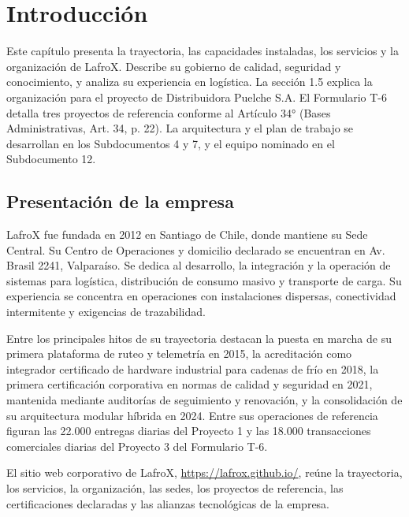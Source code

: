 
\setcounter{chapter}{0}
\chapter{Introducción}
\label{cap:empresa}

Este capítulo presenta la trayectoria, las capacidades instaladas, los servicios y la organización de LafroX. Describe su gobierno de calidad, seguridad y conocimiento, y analiza su experiencia en logística. La sección 1.5 explica la organización para el proyecto de Distribuidora Puelche S.A. El Formulario T-6 detalla tres proyectos de referencia conforme al Artículo 34° (Bases Administrativas, Art. 34, p. 22). La arquitectura y el plan de trabajo se desarrollan en los Subdocumentos 4 y 7, y el equipo nominado en el Subdocumento 12.

\section{Presentación de la empresa}

LafroX fue fundada en 2012 en Santiago de Chile, donde mantiene su Sede Central. Su Centro de Operaciones y domicilio declarado se encuentran en Av. Brasil 2241, Valparaíso. Se dedica al desarrollo, la integración y la operación de sistemas para logística, distribución de consumo masivo y transporte de carga. Su experiencia se concentra en operaciones con instalaciones dispersas, conectividad intermitente y exigencias de trazabilidad.

Entre los principales hitos de su trayectoria destacan la puesta en marcha de su primera plataforma de ruteo y telemetría en 2015, la acreditación como integrador certificado de hardware industrial para cadenas de frío en 2018, la primera certificación corporativa en normas de calidad y seguridad en 2021, mantenida mediante auditorías de seguimiento y renovación, y la consolidación de su arquitectura modular híbrida en 2024. Entre sus operaciones de referencia figuran las 22.000 entregas diarias del Proyecto 1 y las 18.000 transacciones comerciales diarias del Proyecto 3 del Formulario T-6.

El sitio web corporativo de LafroX, \url{https://lafrox.github.io/}, reúne la trayectoria, los servicios, la organización, las sedes, los proyectos de referencia, las certificaciones declaradas y las alianzas tecnológicas de la empresa.

